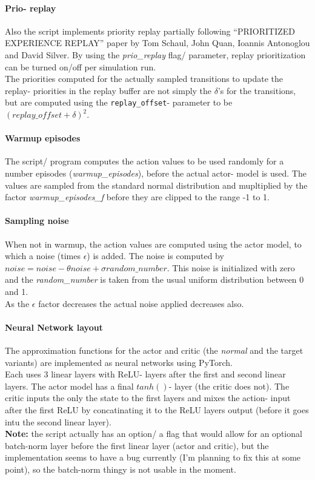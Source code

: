 \documentclass[a4paper]{article}
\begin{document}
\paragraph{Prio- replay}
Also the script implements priority replay partially following \enquote{PRIORITIZED EXPERIENCE REPLAY}
paper by Tom Schaul, John Quan, Ioannis Antonoglou and David Silver.
By using the \textit{prio\_replay} flag/ parameter, replay prioritization can be
turned on/off per simulation run.\\
The priorities computed for the actually sampled transitions to update the
replay- priorities in the replay buffer are not simply the $\delta$'s for
the transitions, but are computed using the \texttt{replay\_offset}- parameter
to be $(replay\_offset + \delta)^2$.

\paragraph{Warmup episodes}
The script/ program computes the action values to be used randomly for
a number episodes (\textit{warmup\_episodes}), before the actual actor- model
is used. The values are sampled from the standard normal distribution and
mupltiplied by the factor \textit{warmup\_episodes\_f} before they are clipped
to the range -1 to 1.

\paragraph{Sampling noise}
When not in warmup, the action values are computed using the actor model,
to which a noise (times $\epsilon$) is added. The noise is computed by
$noise = noise -\theta noise + \sigma random\_number$. This noise is
initialized with zero and the \textit{random\_number} is taken from the
usual uniform distribution between 0 and 1.
\\
As the $\epsilon$ factor decreases the actual noise applied decreases also.

\paragraph{Neural Network layout}
The approximation functions for the actor and critic (the \textit{normal}
and the target variants) are implemented as neural networks using PyTorch.
\\
Each uses 3 linear layers with ReLU- layers after the first and second linear
layers. The actor model has a final $tanh()$- layer (the critic does not).
The critic inputs the only the state to the first layers and mixes the action-
input after the first ReLU by concatinating it to the ReLU layers output
(before it goes intu the second linear layer).
\\
\textbf{Note:} the script actually has an option/ a flag that would allow for
an optional batch-norm layer before the first linear layer (actor and critic),
but the implementation seems to have a bug currently (I'm planning to fix this
at some point), so the batch-norm thingy is not usable in the moment. 
\end{document}
